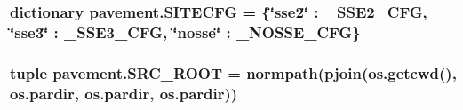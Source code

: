 \subsubsection[{S\+I\+T\+E\+C\+F\+G}]{\setlength{\rightskip}{0pt plus 5cm}dictionary pavement.\+S\+I\+T\+E\+C\+F\+G = \{\char`\"{}sse2\char`\"{} \+: \+\_\+\+S\+S\+E2\+\_\+\+C\+F\+G, \char`\"{}sse3\char`\"{} \+: \+\_\+\+S\+S\+E3\+\_\+\+C\+F\+G, \char`\"{}nosse\char`\"{} \+: \+\_\+\+N\+O\+S\+S\+E\+\_\+\+C\+F\+G\}}\label{namespacepavement_aa956087044872a74ace6e2618c0ae2c6}
\hypertarget{namespacepavement_a4ad470d58095dd6fd0ddede7e8d7beac}{}
\subsubsection[{S\+R\+C\+\_\+\+R\+O\+O\+T}]{\setlength{\rightskip}{0pt plus 5cm}tuple pavement.\+S\+R\+C\+\_\+\+R\+O\+O\+T = normpath(pjoin(os.\+getcwd(), os.\+pardir, os.\+pardir, os.\+pardir))}\label{namespacepavement_a4ad470d58095dd6fd0ddede7e8d7beac}
